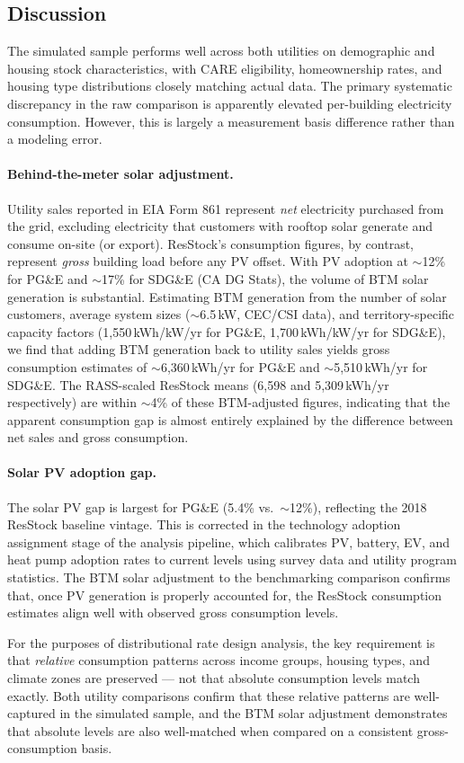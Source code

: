 \documentclass[12pt]{article}
\begin{document}
\subsection{Discussion}

The simulated sample performs well across both utilities on demographic and housing stock characteristics, with CARE eligibility, homeownership rates, and housing type distributions closely matching actual data. The primary systematic discrepancy in the raw comparison is apparently elevated per-building electricity consumption. However, this is largely a measurement basis difference rather than a modeling error.

\paragraph{Behind-the-meter solar adjustment.}
Utility sales reported in EIA Form 861 represent \textit{net} electricity purchased from the grid, excluding electricity that customers with rooftop solar generate and consume on-site (or export). ResStock's consumption figures, by contrast, represent \textit{gross} building load before any PV offset. With PV adoption at $\sim$12\% for PG\&E and $\sim$17\% for SDG\&E (CA DG Stats), the volume of BTM solar generation is substantial. Estimating BTM generation from the number of solar customers, average system sizes ($\sim$6.5\,kW, CEC/CSI data), and territory-specific capacity factors (1,550\,kWh/kW/yr for PG\&E, 1,700\,kWh/kW/yr for SDG\&E), we find that adding BTM generation back to utility sales yields gross consumption estimates of $\sim$6,360\,kWh/yr for PG\&E and $\sim$5,510\,kWh/yr for SDG\&E. The RASS-scaled ResStock means (6,598 and 5,309\,kWh/yr respectively) are within $\sim$4\% of these BTM-adjusted figures, indicating that the apparent consumption gap is almost entirely explained by the difference between net sales and gross consumption.

\paragraph{Solar PV adoption gap.}
The solar PV gap is largest for PG\&E (5.4\% vs.\ $\sim$12\%), reflecting the 2018 ResStock baseline vintage. This is corrected in the technology adoption assignment stage of the analysis pipeline, which calibrates PV, battery, EV, and heat pump adoption rates to current levels using survey data and utility program statistics. The BTM solar adjustment to the benchmarking comparison confirms that, once PV generation is properly accounted for, the ResStock consumption estimates align well with observed gross consumption levels.

For the purposes of distributional rate design analysis, the key requirement is that \textit{relative} consumption patterns across income groups, housing types, and climate zones are preserved --- not that absolute consumption levels match exactly. Both utility comparisons confirm that these relative patterns are well-captured in the simulated sample, and the BTM solar adjustment demonstrates that absolute levels are also well-matched when compared on a consistent gross-consumption basis.
\end{document}

